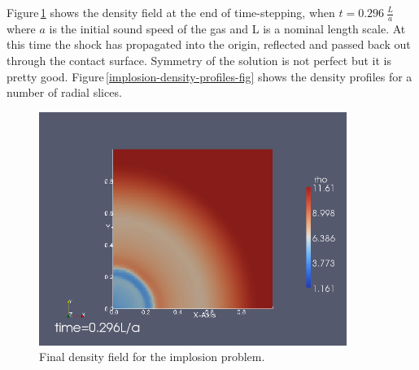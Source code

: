 \medskip
Figure\,\ref{implosion-final-density-fig} shows the density field at the end of
time-stepping, when $t=0.296 ~ \frac{L}{a}$ where $a$ is the initial sound speed of the gas
and L is a nominal length scale.
At this time the shock has propagated into the origin, reflected and passed back out 
through the contact surface.
Symmetry of the solution is not perfect but it is pretty good.
Figure\,\ref{implosion-density-profiles-fig} shows the density profiles for a number of radial slices.


\begin{figure}[htbp]
\begin{center}
\includegraphics[width=10cm]{../2D/implosion/density-t9999.png}
\end{center}
\caption{Final density field for the implosion problem.}
\label{implosion-final-density-fig}
\end{figure}

